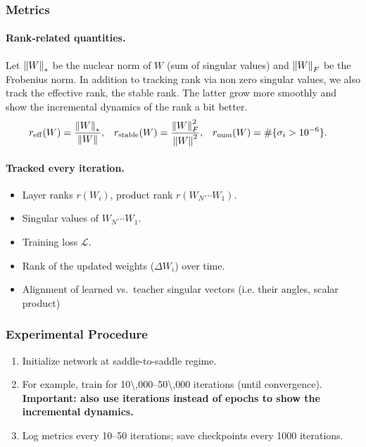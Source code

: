 \documentclass[11pt]{article}
\newcommand{\Wi}{\ensuremath{W_i}}
\newcommand{\Wprod}{\ensuremath{W_N\cdots W_1}}
\begin{document}
\subsubsection*{Metrics}

\paragraph*{Rank‐related quantities.}
Let $\norm{W}_*$ be the nuclear norm of $W$ (sum of singular values) and $\norm{W}_F$ be the Frobenius norm. In addition to tracking rank via non zero singular values, we also track the effective rank, the stable rank. The latter grow more smoothly and show the incremental dynamics of the rank a bit better.
\begin{align*}
  r_{\mathrm{eff}}(W) &= \frac{\norm{W}_*}{\norm{W}}, &
  r_{\mathrm{stable}}(W) &= \frac{\norm{W}_F^2}{\norm{W}^2}, &
  r_{\mathrm{num}}(W) &= \#\{\sigma_i > 10^{-6}\}.
\end{align*}

\paragraph*{Tracked every iteration.}
\begin{itemize}[nosep]
  \item Layer ranks \(r(\Wi)\), product rank \(r(\Wprod)\).
  \item Singular values of \(\Wprod\).
  \item Training loss \(\mathcal{L}\).
  \item Rank of the updated weights (\(\Delta{\Wi}\)) over time.
  \item Alignment of learned vs.\ teacher singular vectors (i.e. their angles, scalar product)
\end{itemize}

\subsubsection*{Experimental Procedure}

\begin{enumerate}[nosep]
  \item Initialize network at saddle-to-saddle regime.
  \item For example, train for \num{10\,000}–\num{50\,000} iterations (until convergence). \textbf{Important: also use iterations instead of epochs to show the incremental dynamics.}
  \item Log metrics every 10–50 iterations; save checkpoints every 1000 iterations.
\end{enumerate}
\end{document}
